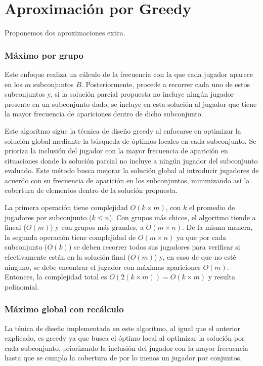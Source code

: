 \section{Aproximación por Greedy}

Proponemos dos aproximaciones extra.

\subsubsection{Máximo por grupo}
Este enfoque realiza un cálculo de la frecuencia con la que cada jugador aparece en los $m$ subconjuntos $B$. Posteriormente, procede a recorrer cada uno de estos subconjuntos y, si la solución parcial propuesta no incluye ningún jugador presente en un subconjunto dado, se incluye en esta solución al jugador que tiene la mayor frecuencia de apariciones dentro de dicho subconjunto.

Este algorítmo sigue la técnica de diseño greedy al enfocarse en optimizar la solución global mediante la búsqueda de óptimos locales en cada subconjunto. Se prioriza la inclusión del jugador con la mayor frecuencia de aparición en situaciones donde la solución parcial no incluye a ningún jugador del subconjunto evaluado. Este método busca mejorar la solución global al introducir jugadores de acuerdo con su frecuencia de aparición en los subconjuntos, minimizando así la cobertura de elementos dentro de la solución propuesta.



La primera operación tiene complejidad $O(k \times m)$, con $k$ el promedio de jugadores por subconjunto ($k \leq n$). Con grupos más chicos, el algoritmo tiende a lineal ($O(m)$) y con grupos más grandes, a $O(m\times n)$. 
De la misma manera, la segunda operación tiene complejidad de  $O(m\times n)$ ya que por cada subconjunto ($O(k)$) se deben recorrer todos sus jugadores para verificar si efectivamente están en la solución final ($O(m)$) y, en caso de que no esté ninguno, se debe encontrar el jugador con máximas apariciones $O(m)$. Entonces, la complejidad total es $O(2(k \times m))=O(k \times m)$ y resulta polinomial.

\subsubsection{Máximo global con recálculo}

La ténica de diseño implementada en este algorítmo, al igual que el anterior explicado,  es greedy ya que busca el óptimo local al optimizar la solución por cada subconjunto, priorizando la inclusión del jugador con la mayor frecuencia hasta que se cumpla la cobertura de por lo menos un jugador por conjuntos.

